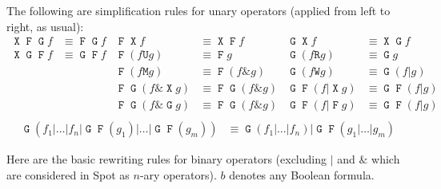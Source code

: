 \documentclass[a4paper,twoside,10pt,DIV=12]{scrreprt}
\DeclareMathOperator{\F}{\texttt{F}}
\DeclareMathOperator{\G}{\texttt{G}}
\newcommand{\U}{\mathbin{\texttt{U}}}
\newcommand{\R}{\mathbin{\texttt{R}}}
\DeclareMathOperator{\X}{\texttt{X}}
\newcommand{\M}{\mathbin{\texttt{M}}}
\newcommand{\W}{\mathbin{\texttt{W}}}
\newcommand{\OR}{\mathbin{\texttt{|}}}
\newcommand{\AND}{\mathbin{\texttt{\&}}}
\newcommand{\0}{\texttt{0}}
\newcommand{\1}{\texttt{1}}
\begin{document}
The following are simplification rules for unary operators (applied
from left to right, as usual):
\begin{align*}
  \X\F\G f & \equiv \F\G f & \F\X f           & \equiv \X\F f        & \G\X f          & \equiv \X\G f       \\
  \X\G\F f & \equiv \G\F f & \F(f\U g)        & \equiv \F g          & \G(f \R g)      & \equiv \G g         \\
           &               & \F(f\M g)        & \equiv \F (f\AND g)  & \G(f \W g)      & \equiv \G(f\OR g)   \\
           &               & \F\G(f\AND \X g) & \equiv \F\G(f\AND g) & \G\F(f\OR \X g) & \equiv \G\F(f\OR g) \\
           &               & \F\G(f\AND \G g) & \equiv \F\G(f\AND g) & \G\F(f\OR \F g) & \equiv \G\F(f\OR g) \\
\end{align*}
\begin{align*}
  \G(f_1\OR\ldots\OR f_n \OR \G\F(g_1)\OR\ldots\OR \G\F(g_m)) & \equiv \G(f_1\OR\ldots\OR f_n)\OR \G\F(g_1\OR\ldots\OR g_m)
\end{align*}


Here are the basic rewriting rules for binary operators (excluding
$\OR$ and $\AND$ which are considered in Spot as $n$-ary operators).
$b$ denotes any Boolean formula.
\end{document}
